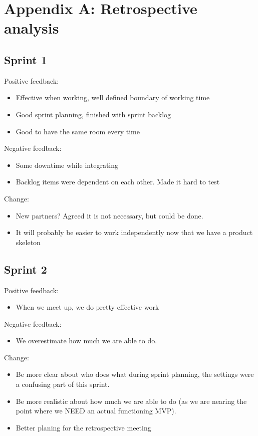 \documentclass[a4paper,12pt]{article}
\begin{document}
\section{Appendix A: Retrospective analysis}
\subsection{Sprint 1}
Positive feedback:
\begin{itemize}
	\item Effective when working, well defined boundary of working time
	\item Good sprint planning, finished with sprint backlog
	\item Good to have the same room every time
\end{itemize}
 Negative feedback:
 \begin{itemize}
 	\item Some downtime while integrating
 	\item Backlog items were dependent on each other. Made it hard to test
 \end{itemize}
 Change:
 \begin{itemize}
 	\item New partners? Agreed it is not necessary, but could be done.
 	\item It will probably be easier to work independently now that we have a product skeleton
 \end{itemize}
 
 \subsection{Sprint 2}
 Positive feedback:
 \begin{itemize}
 	\item When we meet up, we do pretty effective work
 \end{itemize}
 Negative feedback:
 \begin{itemize}
 	\item We overestimate how much we are able to do.
 \end{itemize}
 Change:
 \begin{itemize}
 	\item Be more clear about who does what during sprint planning, the settings were a confusing part of this sprint.
 	\item Be more realistic about how much we are able to do (as we are nearing the point where we NEED an actual functioning MVP).
 	\item Better planing for the retrospective meeting\
 \end{itemize}
 
\end{document}
